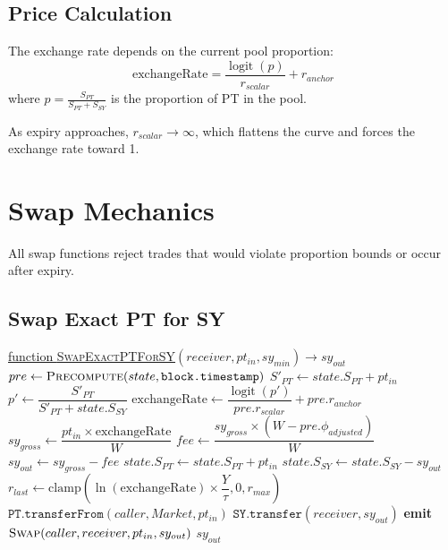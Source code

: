 \subsection{Price Calculation}

The exchange rate depends on the current pool proportion:
\[
\text{exchangeRate} = \frac{\operatorname{logit}(p)}{r_{scalar}} + r_{anchor}
\]
where $p = \frac{S_{PT}}{S_{PT} + S_{SY}}$ is the proportion of PT in the pool.

As expiry approaches, $r_{scalar} \to \infty$, which flattens the curve and forces the exchange rate toward 1.

\section{Swap Mechanics}

All swap functions reject trades that would violate proportion bounds or occur after expiry.

\subsection{Swap Exact PT for SY}

\begin{algorithm}[H]
\caption{Swap Exact PT for SY}
\underline{function \textsc{SwapExactPTForSY}}$(receiver, pt_{in}, sy_{min}) \rightarrow sy_{out}$\;
\BlankLine
$pre \gets \textsc{Precompute}(state, \texttt{block.timestamp})$\;
\BlankLine
{}
$S'_{PT} \gets state.S_{PT} + pt_{in}$\;
$p' \gets \dfrac{S'_{PT}}{S'_{PT} + state.S_{SY}}$\;
\BlankLine
{}
$\text{exchangeRate} \gets \dfrac{\operatorname{logit}(p')}{pre.r_{scalar}} + pre.r_{anchor}$\;
\BlankLine
$sy_{gross} \gets \dfrac{pt_{in} \times \text{exchangeRate}}{W}$\;
$fee \gets \dfrac{sy_{gross} \times (W - pre.\phi_{adjusted})}{W}$\;
$sy_{out} \gets sy_{gross} - fee$\;
\BlankLine
{}
\BlankLine
{}
$state.S_{PT} \gets state.S_{PT} + pt_{in}$\;
$state.S_{SY} \gets state.S_{SY} - sy_{out}$\;
$r_{last} \gets \text{clamp}\left(\ln(\text{exchangeRate}) \times \dfrac{Y}{\tau}, 0, r_{max}\right)$\;
\BlankLine
{}
$\texttt{PT.transferFrom}(caller, Market, pt_{in})$\;
$\texttt{SY.transfer}(receiver, sy_{out})$\;
\BlankLine
\textbf{emit} $\textsc{Swap}(caller, receiver, pt_{in}, sy_{out})$\;
\Return $sy_{out}$\;
\end{algorithm}

